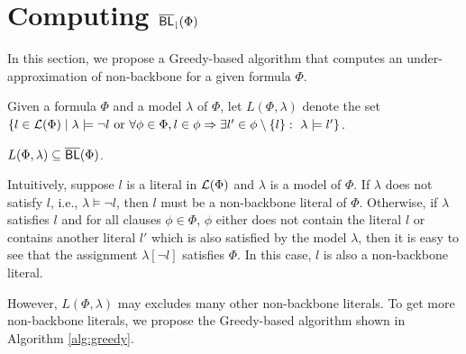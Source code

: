 \section{Computing ${\sf \overline{BL}_\downharpoonright}(\Phi)$}
In this section, we propose a Greedy-based algorithm that computes an under-approximation of non-backbone for a given formula
$\Phi$.

Given a formula $\Phi$ and a model $\lambda$ of $\Phi$, let $L(\Phi,\lambda)$
denote the set $\{l\in{\cal L}(\Phi) \mid \lambda\models \neg l \ \mbox{or} \  \forall \phi\in\Phi, l\in\phi\Rightarrow \exists l'\in\phi\setminus\{l\}: \ \lambda\models l'\}$.


\begin{lemma} \label{lem:navie}
 $L(\Phi,\lambda)\subseteq\overline{\textsf{BL}}(\Phi)$.
\end{lemma}
Intuitively, suppose $l$ is a literal in ${\cal L}(\Phi)$ and $\lambda$ is a model of $\Phi$.
If $\lambda$ does not satisfy $l$, i.e.,  $\lambda\models  \neg l$, then $l$ must be a non-backbone literal of $\Phi$.
Otherwise, if $\lambda$ satisfies $l$ and for all clauses $\phi\in\Phi$, $\phi$ either does not contain the literal
$l$ or contains another literal $l'$ which is also satisfied by the model $\lambda$, then it is easy to see that
the assignment $\lambda[\neg l]$ satisfies $\Phi$.
In this case, $l$ is also a non-backbone literal.

However, $L(\Phi,\lambda)$ may excludes many other non-backbone literals.
To get more non-backbone literals, we propose the Greedy-based algorithm shown in Algorithm \ref{alg:greedy}.

